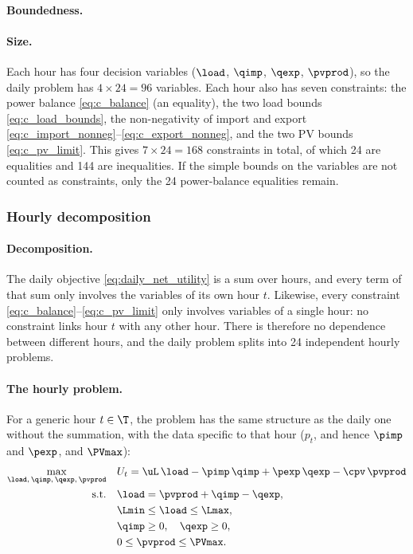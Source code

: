 \paragraph{Boundedness.}

\paragraph{Size.}
Each hour has four decision variables ($\load$, $\qimp$, $\qexp$, $\pvprod$), so the daily
problem has $4 \times 24 = 96$ variables. Each hour also has seven constraints: the power
balance \eqref{eq:c_balance} (an equality), the two load bounds \eqref{eq:c_load_bounds},
the non-negativity of import and export \eqref{eq:c_import_nonneg}--\eqref{eq:c_export_nonneg},
and the two PV bounds \eqref{eq:c_pv_limit}. This gives $7 \times 24 = 168$ constraints in
total, of which 24 are equalities and 144 are inequalities. If the simple bounds on the
variables are not counted as constraints, only the 24 power-balance equalities remain.

\subsubsection{Hourly decomposition}

\paragraph{Decomposition.}
The daily objective \eqref{eq:daily_net_utility} is a sum over hours, and every term of
that sum only involves the variables of its own hour $t$. Likewise, every constraint
\eqref{eq:c_balance}--\eqref{eq:c_pv_limit} only involves variables of a single hour: no
constraint links hour $t$ with any other hour. There is therefore no dependence between
different hours, and the daily problem splits into 24 independent hourly problems.

\paragraph{The hourly problem.}
For a generic hour $t \in \T$, the problem has the same structure as the daily one without
the summation, with the data specific to that hour ($p_t$, and hence $\pimp$ and $\pexp$,
and $\PVmax$):
\begin{align}
    \max_{\load,\, \qimp,\, \qexp,\, \pvprod} \quad
    & U_t = \uL \, \load - \pimp \, \qimp + \pexp \, \qexp - \cpv \, \pvprod \\
    \text{s.t.} \quad
    & \load = \pvprod + \qimp - \qexp, \\
    & \Lmin \leq \load \leq \Lmax, \\
    & \qimp \geq 0, \quad \qexp \geq 0, \\
    & 0 \leq \pvprod \leq \PVmax.
\end{align}

